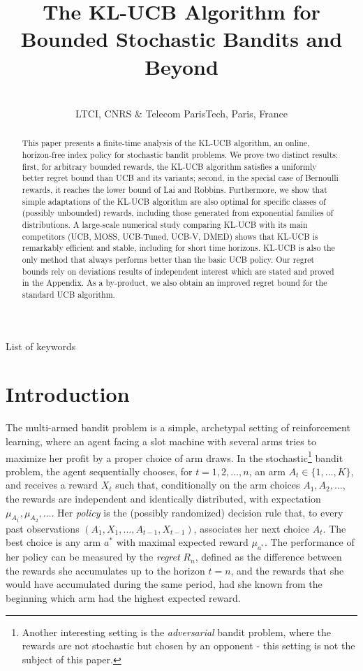 \documentclass[wcp]{jmlr}
\title[KL-UCB: bounded bandits, and beyond]{The KL-UCB Algorithm for Bounded Stochastic Bandits and Beyond}
\author{\Name{Aur\'elien Garivier} \and
   \Name{Olivier Capp\'e} \Email{garivier,cappe@telecom-paristech.fr}\\
   \addr LTCI, CNRS \& Telecom ParisTech, Paris, France}
\newcommand{\1}{\mathbbm{1}}
\begin{document}
\maketitle

\begin{abstract}
  This paper presents a finite-time analysis of the KL-UCB algorithm, an online, horizon-free
  index policy for stochastic bandit problems.
%
  We prove two distinct results: first, for arbitrary bounded rewards, the KL-UCB algorithm
  satisfies a uniformly better regret bound than UCB and its variants; second, in the special case of
  Bernoulli rewards, it reaches the lower bound of Lai and Robbins.
%
  Furthermore, we show that simple adaptations of the KL-UCB algorithm are also optimal for
  specific classes of (possibly unbounded) rewards, including those generated from exponential
  families of distributions.
%
  A large-scale numerical study comparing KL-UCB with its main competitors (UCB, MOSS,
  UCB-Tuned, UCB-V, DMED) shows that KL-UCB is remarkably efficient and stable, including for short time horizons. KL-UCB is also the only method that always performs better
  than the basic UCB policy.
%
  Our regret bounds rely on deviations results of independent interest which are stated and proved
  in the Appendix. As a by-product, we also obtain an improved regret bound for the standard UCB
  algorithm.
\end{abstract}
\begin{keywords}
List of keywords
\end{keywords}

\section{Introduction}\label{sec:intro}

The multi-armed bandit problem is a simple, archetypal setting of reinforcement
learning, where an agent facing a slot machine with several arms tries to
maximize her profit by a proper choice of arm draws.  In the
stochastic\footnote{Another interesting setting is the \emph{adversarial}
  bandit problem, where the rewards are not stochastic but chosen by an
  opponent - this setting is not the subject of this paper.} bandit problem,
the agent sequentially chooses, for $t=1,2,\dots, n$, an arm
$A_t\in\{1,\dots,K\}$, and receives a reward $X_t$ such that, conditionally on
the arm choices $A_1,A_2,\dots$, the rewards are independent and identically
distributed, with expectation $\mu_{A_1},\mu_{A_2},\dots$. Her \emph{policy} is
the (possibly randomized) decision rule that, to every past observations
$(A_{1}, X_1,\dots,A_{t-1}, X_{t-1})$, associates her next choice $A_t$. The best
choice is any arm $a^*$ with maximal expected reward $\mu_{a^*}$. The
performance of her policy can be measured by the \emph{regret} $R_n$, defined as the
difference between the rewards she accumulates up to the horizon $t=n$, and the rewards that she would have accumulated during the same
period, had she known from the beginning which arm had the highest expected reward. %
\end{document}
